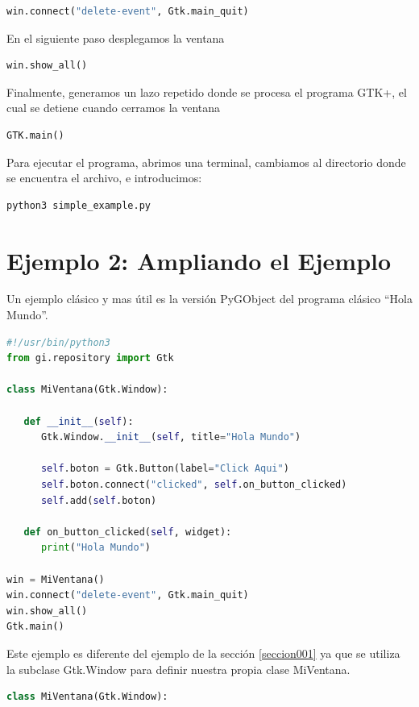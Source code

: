 \documentclass[12pt, twoside]{report}
\begin{document}
\begin{lstlisting}[language=Python]
win.connect("delete-event", Gtk.main_quit)
\end{lstlisting}
En el siguiente paso desplegamos la ventana
\begin{lstlisting}[language=Python]
win.show_all()
\end{lstlisting}

Finalmente, generamos un lazo repetido donde se procesa el programa GTK+, el cual se detiene cuando cerramos la ventana

\begin{lstlisting}[language=Python]
GTK.main()
\end{lstlisting}

Para ejecutar el programa, abrimos una terminal, cambiamos al directorio donde se encuentra el archivo, e introducimos:

\begin{lstlisting}[language=bash]
python3 simple_example.py
\end{lstlisting}


\section{Ejemplo 2: Ampliando el Ejemplo}

Un ejemplo clásico y mas útil es la versión PyGObject del programa clásico ``Hola Mundo''.

\begin{lstlisting}[language=Python]
#!/usr/bin/python3
from gi.repository import Gtk

class MiVentana(Gtk.Window):

   def __init__(self):
      Gtk.Window.__init__(self, title="Hola Mundo")
      
      self.boton = Gtk.Button(label="Click Aqui")
      self.boton.connect("clicked", self.on_button_clicked)
      self.add(self.boton)
      
   def on_button_clicked(self, widget):
      print("Hola Mundo")
      
win = MiVentana()
win.connect("delete-event", Gtk.main_quit)
win.show_all()
Gtk.main()
\end{lstlisting}

Este ejemplo es diferente del ejemplo de la sección \ref{seccion001} ya que se utiliza la subclase Gtk.Window para definir nuestra propia clase MiVentana.

\begin{lstlisting}[language=Python]
class MiVentana(Gtk.Window):
\end{lstlisting}
\end{document}
